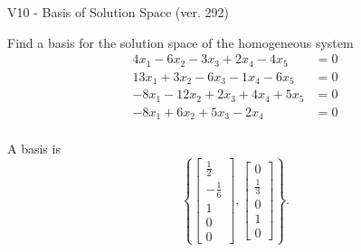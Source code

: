 \begin{exercise}
  \begin{exerciseTitle}V10 - Basis of Solution Space (ver. 292)\end{exerciseTitle}
  \begin{exerciseStatement}
    Find a basis for the solution space of the homogeneous system 
\begin{align*}
 4 x_ 1 -6 x_ 2 -3 x_ 3 + 2 x_ 4 -4 x_ 5 &= 0  \\ 
  13 x_ 1 + 3 x_ 2 -6 x_ 3 -1 x_ 4 -6 x_ 5 &= 0  \\ 
  -8 x_ 1 -12 x_ 2 + 2 x_ 3 + 4 x_ 4 + 5 x_ 5 &= 0  \\ 
  -8 x_ 1 + 6 x_ 2 + 5 x_ 3 -2 x_ 4 &= 0  \\ 
 \end{align*}


 
  \end{exerciseStatement}

  \begin{exerciseAnswer}
   A basis is   
\[\left\{\left[\begin{array}{c}
\frac{1}{2} \\
-\frac{1}{6} \\
1 \\
0 \\
0
\end{array}\right] , \left[\begin{array}{c}
0 \\
\frac{1}{3} \\
0 \\
1 \\
0
\end{array}\right]\right\}.\]

  


  \end{exerciseAnswer}
\end{exercise}